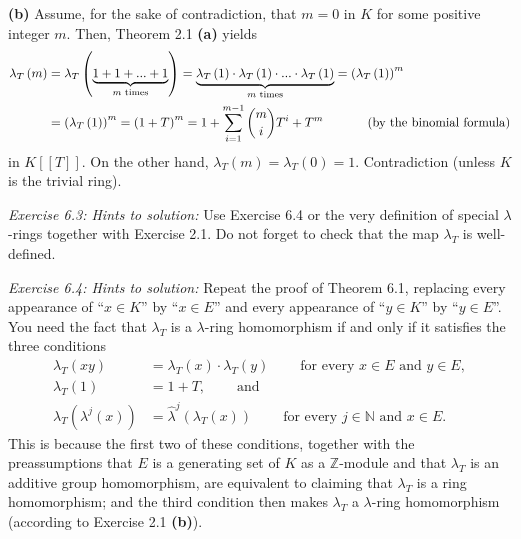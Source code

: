 \documentclass[numbers=enddot,12pt,final,onecolumn,notitlepage]{scrartcl}%
\begin{document}
\textbf{(b)} Assume, for the sake of contradiction, that $m=0$ in $K$ for some
positive integer $m$. Then, Theorem 2.1 \textbf{(a)} yields%
\begin{align*}
\lambda_{T}\left(  m\right)   &  =\lambda_{T}\left(  \underbrace{1+1+...+1}%
_{m\text{ times}}\right)  =\underbrace{\lambda_{T}\left(  1\right)
\cdot\lambda_{T}\left(  1\right)  \cdot...\cdot\lambda_{T}\left(  1\right)
}_{m\text{ times}}=\left(  \lambda_{T}\left(  1\right)  \right)  ^{m}\\
&  =\left(  \lambda_{T}\left(  1\right)  \right)  ^{m}=\left(  1+T\right)
^{m}=1+\sum_{i=1}^{m-1}\dbinom{m}{i}T^{i}+T^{m}\ \ \ \ \ \ \ \ \ \ \left(
\text{by the binomial formula}\right)
\end{align*}
in $K\left[  \left[  T\right]  \right]  $. On the other hand, $\lambda
_{T}\left(  m\right)  =\lambda_{T}\left(  0\right)  =1.$ Contradiction (unless
$K$ is the trivial ring).

\textit{Exercise 6.3: Hints to solution:} Use Exercise 6.4 or the very
definition of special $\lambda$-rings together with Exercise 2.1. Do not
forget to check that the map $\lambda_{T}$ is well-defined.

\textit{Exercise 6.4: Hints to solution:} Repeat the proof of Theorem 6.1,
replacing every appearance of ``$x\in K$'' by ``$x\in E$'' and every appearance of
``$y\in K$'' by ``$y\in E$''. You need the fact that $\lambda_{T}$ is a $\lambda
$-ring homomorphism if and only if it satisfies the three conditions%
\begin{align*}
\lambda_{T}\left(  xy\right)   &  =\lambda_{T}\left(  x\right)  \widehat{\cdot
}\lambda_{T}\left(  y\right)  \ \ \ \ \ \ \ \ \ \ \text{for every }x\in
E\text{ and }y\in E,\\
\lambda_{T}\left(  1\right)   &  =1+T,\ \ \ \ \ \ \ \ \ \ \text{and}\\
\lambda_{T}\left(  \lambda^{j}\left(  x\right)  \right)   &  =\widehat{\lambda
}^{j}\left(  \lambda_{T}\left(  x\right)  \right)
\ \ \ \ \ \ \ \ \ \ \text{for every }j\in\mathbb{N}\text{ and }x\in E.
\end{align*}
This is because the first two of these conditions, together with the
preassumptions that $E$ is a generating set of $K$ as a $\mathbb{Z}$-module
and that $\lambda_{T}$ is an additive group homomorphism, are equivalent to
claiming that $\lambda_{T}$ is a ring homomorphism; and the third condition
then makes $\lambda_{T}$ a $\lambda$-ring homomorphism (according to Exercise
2.1 \textbf{(b)}).
\end{document}
